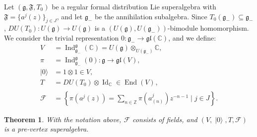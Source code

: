 \documentclass[a4paper, 12pt, reqno]{amsart}
\newtheorem{theorem}{Theorem}[section]
\theoremstyle{remark}
\DeclareMathOperator{\Id}{Id}
\DeclareMathOperator{\End}{End}
\DeclareMathOperator{\Ind}{Ind}
\DeclareMathOperator{\vac}{|0\rangle}
\DeclareMathOperator{\zero}{\overline{0}}
\begin{document}
Let $(\mathfrak{g}, \mathfrak{F}, T_0)$ be a regular formal distribution Lie superalgebra with $\mathfrak{F} = \{a^j(z)\}_{j \in J}$, and let $\mathfrak{g}_-$ be the annihilation subalgebra.
Since $T_0(\mathfrak{g}_-) \subseteq \mathfrak{g}_-$, $DU(T_0): U(\mathfrak{g}) \to U(\mathfrak{g})$ is a $(U(\mathfrak{g}), U(\mathfrak{g}_-))$-bimodule homomorphism.
We consider the trivial representation $0: \mathfrak{g}_- \to \mathfrak{gl}(\mathbb{C})$, and we define:
\begin{align*}
  V &= \Ind^{\mathfrak{g}}_{\mathfrak{g}_-}(\mathbb{C}) = U(\mathfrak{g}) \otimes_{U(\mathfrak{g}_-)} \mathbb{C}, \\
  \pi &= \Ind^{\mathfrak{g}}_{\mathfrak{g}_-}(0): \mathfrak{g} \to \mathfrak{gl}(V), \\
  \vac &= 1\otimes1 \in V, \\
  T &= DU(T_0)\otimes\Id_{\mathbb{C}} \in \End(V)_{\zero}, \\
  \mathcal{F} &= \left\{\pi(a^j(z)) = \sum_{n \in \mathbb{Z}}\pi(a^j_{(n)})z^{-n - 1} \mid j \in J\right\}.
\end{align*}

\begin{theorem}
  \label{thr:19}
  With the notation above, $\mathcal{F}$ consists of fields, and $(V, \vac, T, \mathcal{F})$ is a pre-vertex superalgebra.
\end{theorem}
\end{document}
